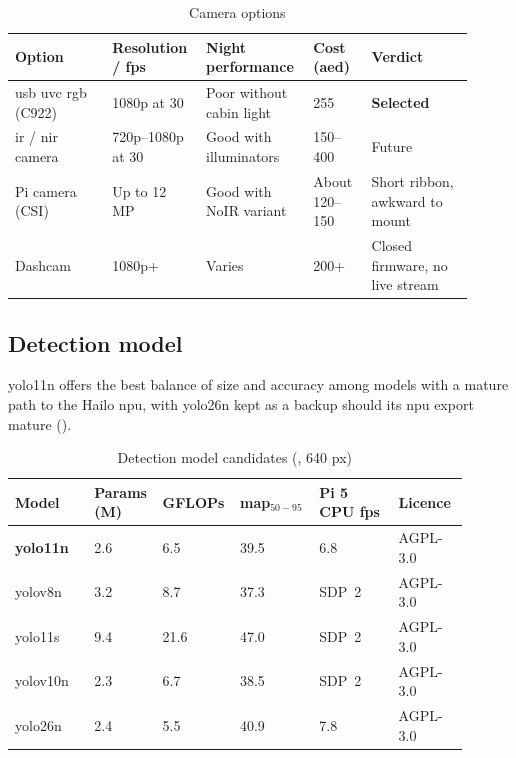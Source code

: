 \begin{table}[htbp]
\centering
\caption{Camera options}
\label{tab:ch4-09}
\footnotesize
\setlength{\tabcolsep}{3pt}
\renewcommand{\arraystretch}{1.15}
\begin{tabular}{|p{0.200\linewidth}|p{0.180\linewidth}|p{0.200\linewidth}|p{0.120\linewidth}|p{0.210\linewidth}|}
\hline
\textbf{Option} & \textbf{Resolution / \gls{fps}} & \textbf{Night performance} & \textbf{Cost (\gls{aed})} & \textbf{Verdict} \\
\hline
\gls{usb} \gls{uvc} \gls{rgb} (C922) & 1080p at 30 & Poor without cabin light & 255 & \textbf{Selected} \\
\hline
\gls{ir} / \gls{nir} camera & 720p--1080p at 30 & Good with illuminators & 150--400 & Future \\
\hline
Pi camera (CSI) & Up to 12 MP & Good with NoIR variant & About 120--150 & Short ribbon, awkward to mount \\
\hline
Dashcam & 1080p+ & Varies & 200+ & Closed firmware, no live stream \\
\hline
\end{tabular}
\end{table}

\subsection{Detection model}

\gls{yolo}11n offers the best balance of size and accuracy among models with a mature path to the Hailo \gls{npu}, with \gls{yolo}26n kept as a backup should its \gls{npu} export mature ().


\begin{table}[htbp]
\centering
\caption{Detection model candidates (, 640 px)}
\label{tab:ch4-10}
\footnotesize
\setlength{\tabcolsep}{3pt}
\renewcommand{\arraystretch}{1.15}
\begin{tabular}{|p{0.170\linewidth}|p{0.120\linewidth}|p{0.120\linewidth}|p{0.170\linewidth}|p{0.170\linewidth}|p{0.150\linewidth}|}
\hline
\textbf{Model} & \textbf{Params (M)} & \textbf{GFLOPs} & \textbf{\gls{map}$_{50-95}$} & \textbf{Pi 5 CPU \gls{fps}} & \textbf{Licence} \\
\hline
\textbf{\gls{yolo}11n} \cite{r45} & 2.6 & 6.5 & 39.5 & 6.8 \cite{r52} & AGPL-3.0 \\
\hline
\gls{yolo}v8n & 3.2 & 8.7 & 37.3 & SDP~2 & AGPL-3.0 \\
\hline
\gls{yolo}11s & 9.4 & 21.6 & 47.0 & SDP~2 & AGPL-3.0 \\
\hline
\gls{yolo}v10n \cite{r71} & 2.3 & 6.7 & 38.5 & SDP~2 & AGPL-3.0 \\
\hline
\gls{yolo}26n \cite{r76} & 2.4 & 5.5 & 40.9 & 7.8 \cite{r52} & AGPL-3.0 \\
\hline
\end{tabular}
\end{table}

